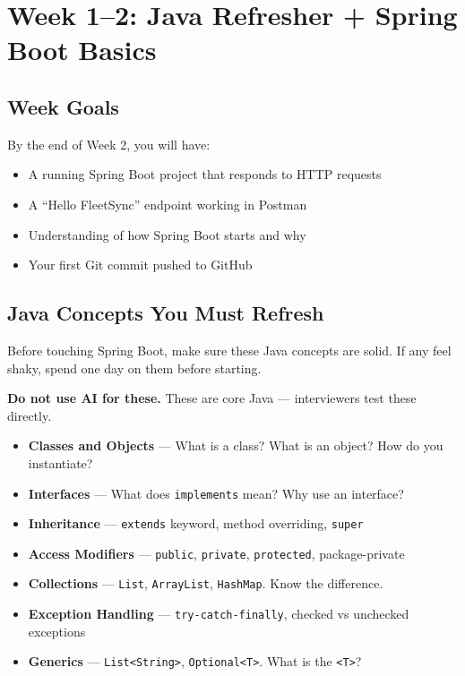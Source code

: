 \documentclass[12pt,a4paper]{report}
\newcommand{\code}[1]{\texttt{\textcolor{keywordblue}{#1}}}
\begin{document}
\chapter{Week 1--2: Java Refresher + Spring Boot Basics}

\section{Week Goals}

By the end of Week 2, you will have:
\begin{itemize}
  \item A running Spring Boot project that responds to HTTP requests
  \item A ``Hello FleetSync'' endpoint working in Postman
  \item Understanding of how Spring Boot starts and why
  \item Your first Git commit pushed to GitHub
\end{itemize}

\section{Java Concepts You Must Refresh}

Before touching Spring Boot, make sure these Java concepts are solid. If any feel shaky, spend one day on them before starting.

\begin{tcolorbox}[handbox]
\textbf{Do not use AI for these.} These are core Java --- interviewers test these directly.

\begin{itemize}
  \item \textbf{Classes and Objects} --- What is a class? What is an object? How do you instantiate?
  \item \textbf{Interfaces} --- What does \code{implements} mean? Why use an interface?
  \item \textbf{Inheritance} --- \code{extends} keyword, method overriding, \code{super}
  \item \textbf{Access Modifiers} --- \code{public}, \code{private}, \code{protected}, package-private
  \item \textbf{Collections} --- \code{List}, \code{ArrayList}, \code{HashMap}. Know the difference.
  \item \textbf{Exception Handling} --- \code{try-catch-finally}, checked vs unchecked exceptions
  \item \textbf{Generics} --- \code{List<String>}, \code{Optional<T>}. What is the \code{<T>}?
\end{itemize}
\end{tcolorbox}
\end{document}
